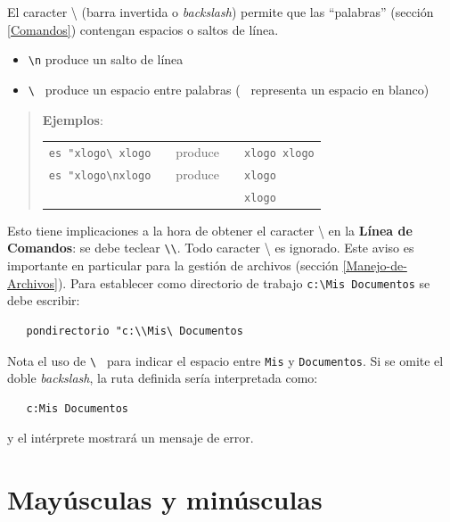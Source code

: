 El caracter \textbackslash{} (barra invertida o \textit{backslash})
  permite que las ``palabras''
(secci\'on \ref{Comandos}) contengan espacios  o
saltos de l\'inea. 
\begin{itemize}
   \item \verb+\n+ produce un salto de l\'inea
   \item \verb*+\ + produce un espacio entre palabras
      \index{\verb*+\ +} (\verb*+ + representa un espacio en blanco)
\end{itemize}
\begin{quote}
   \noindent \textbf{Ejemplos}: 

   \begin{tabular}{lcccl}
      \verb+es "xlogo\ xlogo+ & & produce & &
               \texttt{xlogo xlogo} \\
      \verb+es "xlogo\nxlogo+ & & produce & &
         \texttt{xlogo} \\
         & & & & \texttt{xlogo}
   \end{tabular}
\end{quote}
Esto tiene implicaciones a la hora de obtener el caracter \textbackslash{}
en la \textbf{L\'inea de Comandos}: se debe teclear
\verb+\\+.
Todo caracter \textbackslash{} es ignorado. Este aviso es importante
en particular para la gesti\'on de archivos 
(secci\'on \ref{Manejo-de-Archivos}). Para establecer como directorio
de trabajo \verb+c:\Mis Documentos+ se debe escribir:
\begin{verbatim}
   pondirectorio "c:\\Mis\ Documentos \end{verbatim}
Nota el uso de \verb*+\ + para indicar el espacio entre
\texttt{Mis} y \texttt{Documentos}. Si se omite el doble
\textit{backslash}, la ruta definida ser\'ia interpretada como:
\begin{verbatim}
   c:Mis Documentos \end{verbatim}
y el int\'erprete mostrar\'a un mensaje de error. 

\section{May\'usculas y min\'usculas}
   \label{Mayusculas-y-minusculas}

